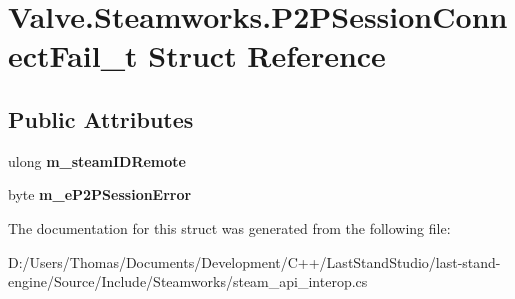 \hypertarget{structValve_1_1Steamworks_1_1P2PSessionConnectFail__t}{}\section{Valve.\+Steamworks.\+P2\+P\+Session\+Connect\+Fail\+\_\+t Struct Reference}
\label{structValve_1_1Steamworks_1_1P2PSessionConnectFail__t}
\subsection*{Public Attributes}
\begin{DoxyCompactItemize}
\item 
\hypertarget{structValve_1_1Steamworks_1_1P2PSessionConnectFail__t_a34da0ed0efc81d5840c4114c2e2a8390}{}ulong {\bfseries m\+\_\+steam\+I\+D\+Remote}\label{structValve_1_1Steamworks_1_1P2PSessionConnectFail__t_a34da0ed0efc81d5840c4114c2e2a8390}

\item 
\hypertarget{structValve_1_1Steamworks_1_1P2PSessionConnectFail__t_a195a9f18aee87ff10e09e15a09f65857}{}byte {\bfseries m\+\_\+e\+P2\+P\+Session\+Error}\label{structValve_1_1Steamworks_1_1P2PSessionConnectFail__t_a195a9f18aee87ff10e09e15a09f65857}

\end{DoxyCompactItemize}


The documentation for this struct was generated from the following file\+:\begin{DoxyCompactItemize}
\item 
D\+:/\+Users/\+Thomas/\+Documents/\+Development/\+C++/\+Last\+Stand\+Studio/last-\/stand-\/engine/\+Source/\+Include/\+Steamworks/steam\+\_\+api\+\_\+interop.\+cs\end{DoxyCompactItemize}
